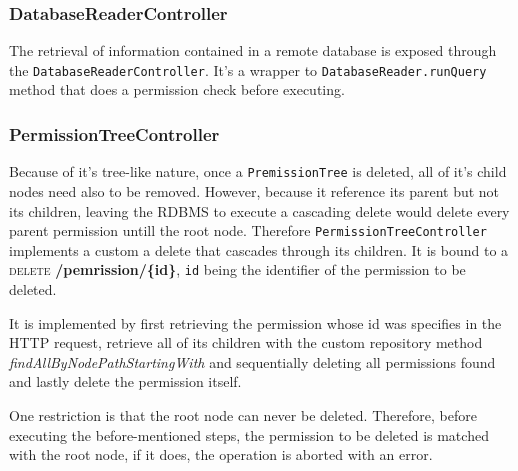 

\subsubsection{DatabaseReaderController}
The retrieval of information contained in a remote database is exposed through the \texttt{DatabaseReaderController}. It's a wrapper to \texttt{DatabaseReader.runQuery} method that does a permission check before executing.

\subsubsection{PermissionTreeController}
Because of it's tree-like nature, once a \texttt{PremissionTree} is deleted, all of it's child nodes need also to be removed. However, because it reference its parent but not its children, leaving the \gls{RDBMS} to execute a cascading delete would delete every parent permission untill the root node.
Therefore \texttt{PermissionTreeController} implements a custom a delete that cascades through its children. It is bound to a \textsc{delete} \textbf{/pemrission/\{id\}}, \texttt{id} being the identifier of the permission to be deleted.

It is implemented by first retrieving the permission whose id was specifies in the \gls{HTTP} request, retrieve all of its children with the custom repository method \textit{findAllByNodePathStartingWith} and sequentially deleting all permissions found and lastly delete the permission itself.

One restriction is that the root node can never be deleted. Therefore, before executing the before-mentioned steps, the permission to be deleted is matched with the root node, if it does, the operation is aborted with an error.

